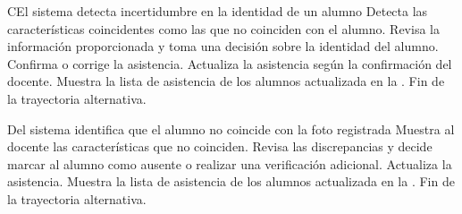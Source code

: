 \begin{UCtrayectoriaA}{C}{El sistema detecta incertidumbre en la identidad de un alumno}
	\UCpaso Detecta las características coincidentes como las que no coinciden con el alumno.
	\UCpaso[\UCactor] Revisa la información proporcionada y toma una decisión sobre la identidad del alumno.
	\UCpaso[\UCactor] Confirma o corrige la asistencia.
	\UCpaso Actualiza la asistencia según la confirmación del docente.
	\UCpaso Muestra la lista de asistencia de los alumnos actualizada en la .
	\UCpaso Fin de la trayectoria alternativa.
\end{UCtrayectoriaA}
\begin{UCtrayectoriaA}{D}{el sistema identifica que el alumno no coincide con la foto registrada}
	\UCpaso Muestra al docente las características que no coinciden.
	\UCpaso[\UCactor] Revisa las discrepancias y decide marcar al alumno como ausente o realizar una verificación adicional.
	\UCpaso Actualiza la asistencia.
	\UCpaso Muestra la lista de asistencia de los alumnos actualizada en la .
	\UCpaso Fin de la trayectoria alternativa.
\end{UCtrayectoriaA}

